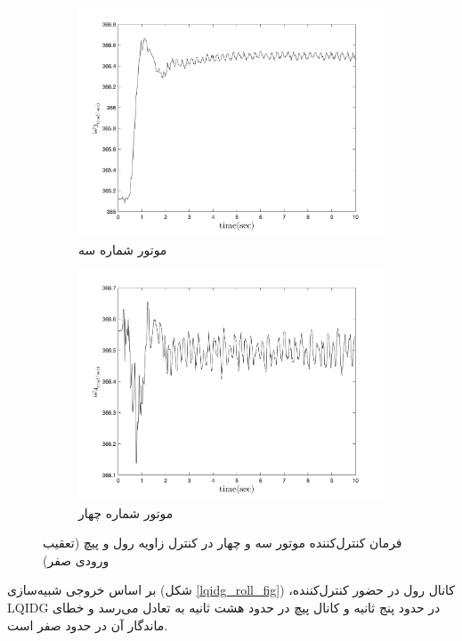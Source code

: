 \begin{figure}
	[width=12cm]
	\centering
	\begin{subfigure}
		\centering
		\includegraphics[width=12cm]{../Figures/Calibration/LQIDG/Roll_Pitch/lqidg_Omega_3.png}
		\caption{موتور شماره سه}
	\end{subfigure}
	\begin{subfigure}
		\centering
		\includegraphics[width=12cm]{../Figures/Calibration/LQIDG/Roll_Pitch/lqidg_Omega_4.png}
		\caption{موتور شماره چهار}
	\end{subfigure}
	\caption{‫‪فرمان کنترل‌کننده موتور سه و چهار در کنترل زاویه رول و پیچ (تعقیب ورودی صفر)}
\end{figure}


بر اساس خروجی شبیه‌سازی (شکل
\ref{lqidg_roll_fig})
،کانال رول در حضور کنترل‌کننده LQIDG در حدود پنج ثانیه و کانال پیچ در حدود هشت ثانیه به تعادل می‌رسد و خطای ماندگار آن در حدود صفر است.